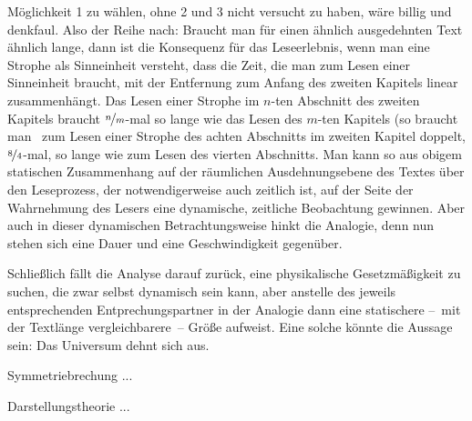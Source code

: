 Möglichkeit 1 zu wählen, ohne 2 und 3 nicht versucht zu haben, wäre billig und
  denkfaul.
Also der Reihe nach:
Braucht man für einen ähnlich ausgedehnten Text ähnlich lange, dann ist die
  Konsequenz für das Leseerlebnis, wenn man eine Strophe als Sinneinheit
  versteht, dass die Zeit, die man zum Lesen einer Sinneinheit braucht, mit der
  Entfernung zum Anfang des zweiten Kapitels linear zusammenhängt.
Das Lesen einer Strophe im $n$-ten Abschnitt des zweiten Kapitels braucht
  $\nicefrac{n}{m}$-mal so lange wie das Lesen des $m$-ten Kapitels (so braucht
  man \zB\ zum Lesen einer Strophe des achten Abschnitts im zweiten Kapitel
  doppelt, $\nicefrac{8}{4}$-mal, so lange wie zum Lesen des vierten
  Abschnitts.
Man kann so aus obigem statischen Zusammenhang auf der räumlichen Ausdehnungsebene
  des Textes über den Leseprozess, der notwendigerweise auch zeitlich ist, auf
  der Seite der Wahrnehmung des Lesers eine dynamische, zeitliche Beobachtung
  gewinnen.
Aber auch in dieser dynamischen Betrachtungsweise hinkt die Analogie, denn nun
  stehen sich eine Dauer und eine Geschwindigkeit gegenüber.

Schließlich fällt die Analyse darauf zurück, eine physikalische
  Gesetzmäßigkeit zu suchen, die zwar selbst dynamisch sein kann, aber
  anstelle des jeweils entsprechenden Entprechungspartner in der Analogie dann eine
  statischere --~mit der Textlänge vergleichbarere~-- Größe aufweist.
Eine solche könnte die Aussage sein: Das Universum dehnt sich aus.

Symmetriebrechung ...

Darstellungstheorie ...
